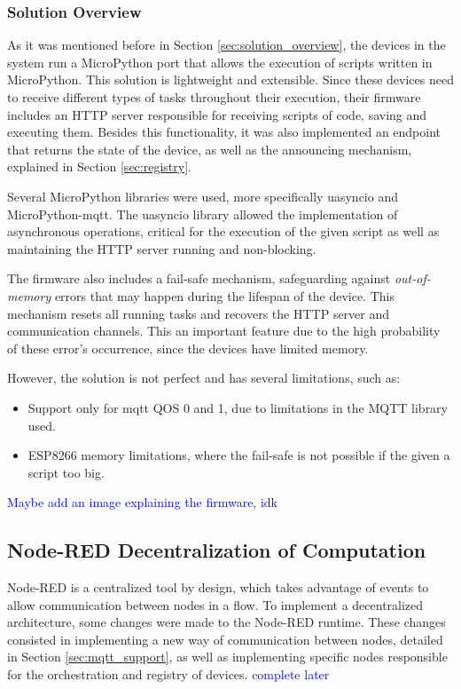 \subsubsection{Solution Overview}

As it was mentioned before in Section \ref{sec:solution_overview}, the devices in the system run a MicroPython port that allows the execution of scripts written in MicroPython. This solution is lightweight and extensible. Since these devices need to receive different types of tasks throughout their execution, their firmware includes an HTTP server responsible for receiving scripts of code, saving and executing them. Besides this functionality, it was also implemented an endpoint that returns the state of the device, as well as the announcing mechanism, explained in Section \ref{sec:registry}.

Several MicroPython libraries were used, more specifically uasyncio and MicroPython-mqtt. The uasyncio library allowed the implementation of asynchronous operations, critical for the execution of the given script as well as maintaining the HTTP server running and non-blocking.

The firmware also includes a fail-safe mechanism, safeguarding against \textit{out-of-memory} errors that may happen during the lifespan of the device. This mechanism resets all running tasks and recovers the HTTP server and communication channels. This an important feature due to the high probability of these error's occurrence, since the devices have limited memory. 

However, the solution is not perfect and has several limitations, such as:

\begin{itemize}
    \item Support only for mqtt QOS 0 and 1, due to limitations in the MQTT library used. 
    \item ESP8266 memory limitations, where the fail-safe is not possible if the given a script too big.
\end{itemize}

\textcolor{blue}{Maybe add an image explaining the firmware, idk}

\subsection{Node-RED Decentralization of Computation}\label{sec:node_red_decentralization}

Node-RED is a centralized tool by design, which takes advantage of events to allow communication between nodes in a flow. To implement a decentralized architecture, some changes were made to the Node-RED runtime. These changes consisted in implementing a new way of communication between nodes, detailed in Section \ref{sec:mqtt_support}, as well as implementing specific nodes responsible for the orchestration and registry of devices. \textcolor{blue}{complete later}

